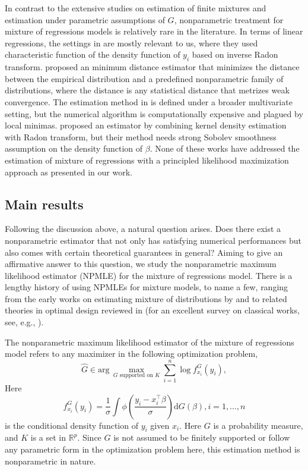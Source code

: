 \documentclass[11pt]{article}
\numberwithin{equation}{section}
\newcommand{\RS}{\mathbb{R}}
\newcommand{\T}{ \top }
\begin{document}
In contrast to the extensive studies on estimation of finite mixtures and estimation under parametric assumptions of $G$, nonparametric treatment for mixture of regressions models is relatively rare in the literature. In terms of linear regressions, the settings in \citet{beran1996nonparametric} are mostly relevant to us, where they used characteristic function of the density function of $y_i$ based on inverse Radon transform. \citet{beran1994minimum} proposed an minimum distance estimator that minimizes the distance between the empirical distribution and a predefined nonparametric family of distributions, where the distance is any statistical distance that metrizes weak convergence. The estimation method in \citet{beran1994minimum} is defined under a broader multivariate setting, but the numerical algorithm is computationally expensive and plagued by local minimas. \citet{hoderlein2010analyzing} proposed an estimator by combining kernel density estimation with Radon transform, but their method needs strong Sobolev smoothness assumption on the density function of $\beta$. None of these works have addressed the estimation of mixture of regressions with a principled likelihood maximization approach as presented in our work.

\subsection{Main results}

Following the discussion above, a natural question arises. Does there exist a nonparametric estimator that not only has satisfying numerical performances but also comes with certain theoretical guarantees in general? Aiming to give an affirmative answer to this question, we study the nonparametric maximum likelihood estimator (NPMLE) for the mixture of regressions model. There is a lengthy history of using NPMLEs for mixture models, to name a few, ranging from the early works on estimating mixture of distributions by \citet{kiefer1956consistency} and \citet{laird1978nonparametric} to related theories in optimal design reviewed in \citet{silvey1980optimal} (for an excellent survey on classical works, see, e.g., \citet{lindsay1995mixture}). 

The nonparametric maximum likelihood estimator of the mixture of regressions model refers to any maximizer in the following optimization problem,
\begin{equation}
 \hat{G} \in \mathrm{arg}\,\underset{G \text{ supported on } K}{\max}\sum_{i=1}^n \log f^G_{x_i}(y_i),
\label{eq:npmle_opt_G}
\end{equation}
Here 
\begin{equation}
f^G_{x_i}(y_i) = \frac{1}{\sigma}\int \phi\left( \frac{y_i -x_i^\T \beta}{\sigma} \right) \mathrm{d} G(\beta), i=1,\dots,n
\label{eq:defn_f_G}
\end{equation}
 is the conditional density function of $y_i$ given $x_i$. Here $G$ is a probability measure, and $K$ is a set in $\RS^p$. Since $G$ is not assumed to be finitely supported or follow any parametric form in the optimization problem here, this estimation method is nonparametric in nature.
\end{document}
